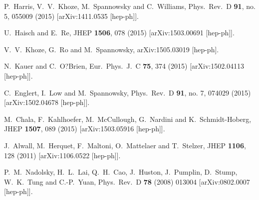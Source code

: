 \documentclass[preprintnumbers,superscriptaddress,nofootinbib,aps,prd,floatfix]{revtex4}
\begin{document}
\begin{thebibliography}{99}
  P.~Harris, V.~V.~Khoze, M.~Spannowsky and C.~Williams,
  Phys.\ Rev.\ D {\bf 91}, no. 5, 055009 (2015)
  [arXiv:1411.0535 [hep-ph]].

  U.~Haisch and E.~Re,
  JHEP {\bf 1506}, 078 (2015)
  [arXiv:1503.00691 [hep-ph]].
  
  V.~V.~Khoze, G.~Ro and M.~Spannowsky,
  arXiv:1505.03019 [hep-ph].

  N.~Kauer and C.~O?Brien,
  Eur.\ Phys.\ J.\ C {\bf 75}, 374 (2015)
  [arXiv:1502.04113 [hep-ph]].

  C.~Englert, I.~Low and M.~Spannowsky,
  Phys.\ Rev.\ D {\bf 91}, no. 7, 074029 (2015)
  [arXiv:1502.04678 [hep-ph]].

  M.~Chala, F.~Kahlhoefer, M.~McCullough, G.~Nardini and K.~Schmidt-Hoberg,
  JHEP {\bf 1507}, 089 (2015)
  [arXiv:1503.05916 [hep-ph]].

  J.~Alwall, M.~Herquet, F.~Maltoni, O.~Mattelaer and T.~Stelzer,
  JHEP {\bf 1106}, 128 (2011)
  [arXiv:1106.0522 [hep-ph]].
 
  P.~M.~Nadolsky, H.~L.~Lai, Q.~H.~Cao, J.~Huston, J.~Pumplin, D.~Stump, W.~K.~Tung and C.-P.~Yuan,
  Phys.\ Rev.\ D {\bf 78} (2008) 013004
  [arXiv:0802.0007 [hep-ph]].


\end{thebibliography}
\end{document}

